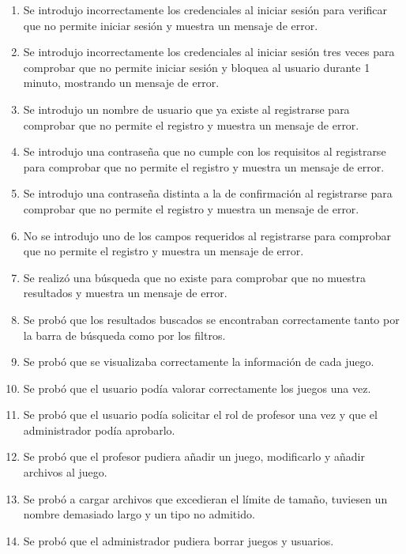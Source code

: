 \begin{enumerate}
    \item Se introdujo incorrectamente los credenciales al iniciar sesión para verificar que no permite iniciar sesión y muestra un mensaje de error.
    \item Se introdujo incorrectamente los credenciales al iniciar sesión tres veces para comprobar que no permite iniciar sesión y bloquea al usuario durante 1 minuto, mostrando un mensaje de error.
    \item Se introdujo un nombre de usuario que ya existe al registrarse para comprobar que no permite el registro y muestra un mensaje de error.
    \item Se introdujo una contraseña que no cumple con los requisitos al registrarse para comprobar que no permite el registro y muestra un mensaje de error.
    \item Se introdujo una contraseña distinta a la de confirmación al registrarse para comprobar que no permite el registro y muestra un mensaje de error.
    \item No se introdujo uno de los campos requeridos al registrarse para comprobar que no permite el registro y muestra un mensaje de error.
    \item Se realizó una búsqueda que no existe para comprobar que no muestra resultados y muestra un mensaje de error.
    \item Se probó que los resultados buscados se encontraban correctamente tanto por la barra de búsqueda como por los filtros.
    \item Se probó que se visualizaba correctamente la información de cada juego.
    \item Se probó que el usuario podía valorar correctamente los juegos una vez.
    \item Se probó que el usuario podía solicitar el rol de profesor una vez y que el administrador podía aprobarlo.
    \item Se probó que el profesor pudiera añadir un juego, modificarlo y añadir archivos al juego.
    \item Se probó a cargar archivos que excedieran el límite de tamaño, tuviesen un nombre demasiado largo y un tipo no admitido.
    \item Se probó que el administrador pudiera borrar juegos y usuarios.
\end{enumerate}


